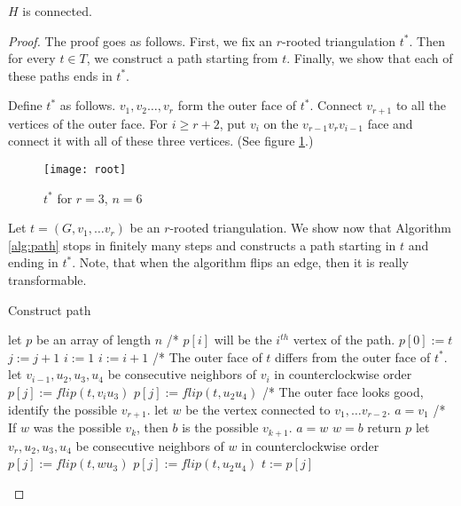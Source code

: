 \begin{thm}
  $H$ is connected.
\end{thm}
\begin{proof}
  The proof goes as follows. First, we fix an $r$-rooted triangulation $t^*$. Then
  for every $t \in T$, we construct a path starting from $t$. Finally,
  we show that each of these paths ends in $t^*$.

  Define $t^*$ as follows. $v_1, v_2 \dots, v_r$ form the outer face of $t^*$.
  Connect $v_{r+1}$ to all the vertices of the outer face. For $i \ge r + 2$,
  put $v_i$ on the $v_{r-1}v_rv_{i-1}$ face and connect it with all of these three vertices.
  (See figure \ref{fig:root}.)

  \begin{figure}[ht]
    \centering
    \texttt{[image: root]}
    \caption{$t^*$ for $r=3$, $n = 6$}
    \label{fig:root}
  \end{figure}

  Let $t = (G, v_1, \dots v_r)$ be an $r$-rooted triangulation. We show now that
  Algorithm \ref{alg:path} stops in finitely many steps and constructs a path
  starting in $t$ and ending in $t^*$. Note, that when the algorithm flips an
  edge, then it is really transformable.
  \begin{algorithm}
    \caption{Construct path} \label{alg:path}
    \begin{algorithmic}
      \STATE let $p$ be an array of length $n$ /* $p[i]$ will be the $i^{th}$ vertex of the path.
      \STATE $p[0] := t$
      \WHILE{\TRUE}
        \STATE $j := j + 1$
        \STATE $i := 1$
          \STATE $i := i + 1$
        \ENDWHILE
          \STATE /* The outer face of $t$ differs from the outer face of $t^*$.
          \STATE let $v_{i - 1}, u_2, u_3, u_4$ be consecutive neighbors of $v_i$ in
          counterclockwise order
            \STATE $p[j] := flip(t, v_iu_3)$
          \ELSE
            \STATE $p[j] := flip(t, u_2u_4)$
          \ENDIF
        \ELSE
          \STATE /* The outer face looks good, identify the possible $v_{r+1}$.
          \STATE let $w$ be the vertex connected to $v_1, \dots v_{r - 2}$.
          \STATE $a = v_1$
            \STATE /* If $w$ was the possible $v_k$, then $b$ is the possible $v_{k + 1}$.
            \STATE $a = w$
            \STATE $w = b$
          \ENDWHILE
            \STATE return $p$
          \ELSE
            \STATE let $v_r, u_2, u_3, u_4$ be consecutive neighbors of $w$ in
            counterclockwise order
              \STATE $p[j] := flip(t, wu_3)$
            \ELSE
              \STATE $p[j] := flip(t, u_2u_4)$
            \ENDIF
          \ENDIF
        \ENDIF
        \STATE $t := p[j]$
      \ENDWHILE
    \end{algorithmic}
  \end{algorithm}


\end{proof}
